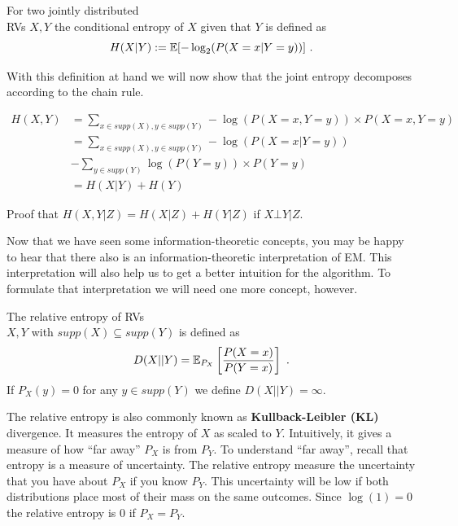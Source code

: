 \begin{Definition}
For two jointly distributed \\ RVs $ X,Y $ the conditional entropy of $ X $ given that $ Y $ is defined as
$$ H(X|Y) := \mathbb{E}[-\log_{2}(P(X=x|Y=y))] \ . $$
\end{Definition}

With this definition at hand we will now show that the joint entropy decomposes according to the
chain rule.

\begin{align}
H(X,Y) &= \underset{x \in supp(X), y \in supp(Y)}{\sum} -\log(P(X=x,Y=y)) \times P(X=x, Y=y) \\
&= \underset{x \in supp(X), y \in supp(Y)}{\sum} -\log(P(X=x| Y=y)) \\ &- \underset{y \in supp(Y)}{\sum}\log(P(Y=y)) \times P(Y=y) \nonumber \\
&= H(X|Y) + H(Y)
\end{align}

\begin{Exercise}
Proof that $ H(X,Y|Z) = H(X|Z) + H(Y|Z) $ if $ X \bot Y|Z $.
\end{Exercise}

Now that we have seen some information-theoretic concepts, you may be happy to hear that there also is an information-theoretic interpretation
of EM. This interpretation will also help us to get a better intuition for the algorithm. To formulate that interpretation we will need
one more concept, however.

\begin{Definition}
The relative entropy of RVs \\ $ X,Y $ with $ supp(X) \subseteq supp(Y) $ is defined as
$$ D(X||Y) = \mathbb{E}_{P_{X}}\left[\frac{P(X=x)}{P(Y=x)} \right] \ . $$
If $ P_{X}(y) = 0 $ for any $ y \in supp(Y) $ we define $ D(X||Y) = \infty $.
\end{Definition}

The relative entropy is also commonly known as \textbf{Kullback-Leibler (KL)} divergence. It measures the entropy of $ X $ as scaled to $ Y $. Intuitively,
it gives a measure of how ``far away'' $ P_{X} $ is from $ P_{Y} $. To understand ``far away'', recall that entropy is a measure of uncertainty. The
relative entropy measure the uncertainty that you have about $ P_{X} $ if you know $ P_{Y} $. This uncertainty will be low if both distributions place most
of their mass on the same outcomes. Since $ \log(1) = 0 $ the relative entropy is 0 if $ P_{X} = P_{Y} $.

